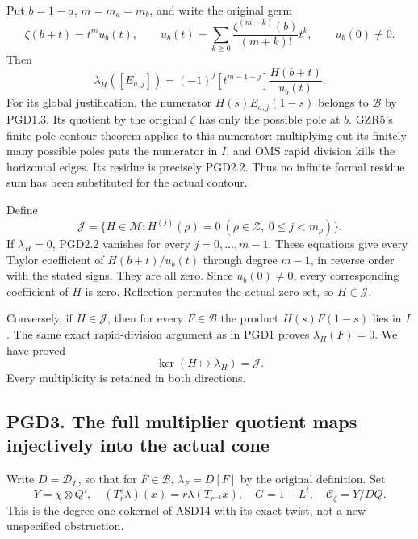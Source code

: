 Put \(b=1-a\), \(m=m_a=m_b\), and write the original germ \[
\zeta(b+t)=t^m u_b(t),\qquad
u_b(t)=\sum_{k\ge0}\frac{\zeta^{(m+k)}(b)}{(m+k)!}t^k,
\qquad u_b(0)\ne0.
\] Then \[
\boxed{\lambda_H([E_{a,j}])=(-1)^j
[t^{m-1-j}]\frac{H(b+t)}{u_b(t)}.}
\tag{PGD2.2}
\] For its global justification, the numerator \(H(s)E_{a,j}(1-s)\)
belongs to \(\mathcal B\) by PGD1.3. Its quotient by the original
\(\zeta\) has only the possible pole at \(b\). GZR5's finite-pole
contour theorem applies to this numerator: multiplying out its finitely
many possible poles puts the numerator in \(I\), and OMS rapid division
kills the horizontal edges. Its residue is precisely PGD2.2. Thus no
infinite formal residue sum has been substituted for the actual contour.

Define \[
\mathcal J=\{H\in\mathcal M:H^{(j)}(\rho)=0
\ (\rho\in\mathscr Z,\ 0\le j<m_\rho)\}.
\tag{PGD2.3}
\] If \(\lambda_H=0\), PGD2.2 vanishes for every \(j=0,\ldots,m-1\).
These equations give every Taylor coefficient of \(H(b+t)/u_b(t)\)
through degree \(m-1\), in reverse order with the stated signs. They are
all zero. Since \(u_b(0)\ne0\), every corresponding coefficient of \(H\)
is zero. Reflection permutes the actual zero set, so \(H\in\mathcal J\).

Conversely, if \(H\in\mathcal J\), then for every \(F\in\mathcal B\) the
product \(H(s)F(1-s)\) lies in \(I\). The same exact rapid-division
argument as in PGD1 proves \(\lambda_H(F)=0\). We have proved \[
\boxed{\ker(H\mapsto\lambda_H)=\mathcal J.}
\tag{PGD2.4}
\] Every multiplicity is retained in both directions.

\subsection{PGD3. The full multiplier quotient maps injectively into the
actual
cone}\label{pgd3.-the-full-multiplier-quotient-maps-injectively-into-the-actual-cone}

Write \(D=\mathcal D_L\), so that for \(F\in\mathcal B\),
\(\lambda_F=D[F]\) by the original definition. Set \[
Y=\chi\otimes Q',\quad (T_r^\diamond\lambda)(x)=r\lambda(T_{r^{-1}}x),
\quad G=1-L^t,\quad
\mathcal C_\zeta=Y/DQ.
\tag{PGD3.1}
\] This is the degree-one cokernel of ASD14 with its exact twist, not a
new unspecified obstruction.

